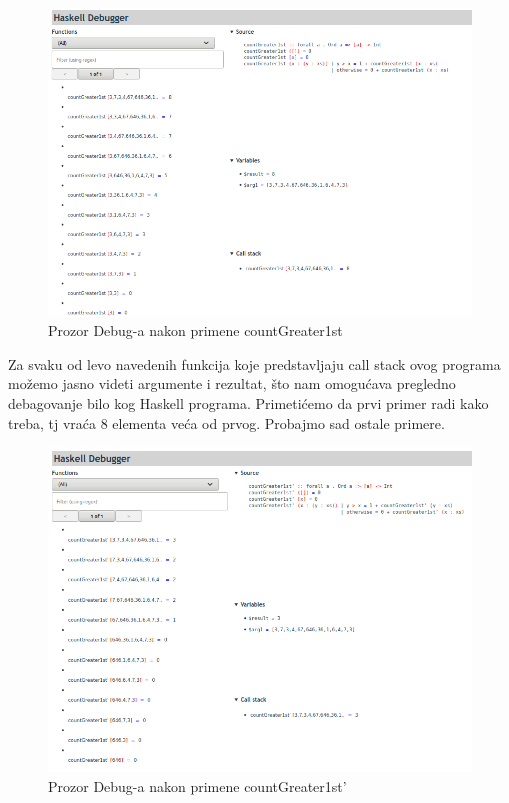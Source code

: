 \documentclass[a4paper]{article}
\begin{document}
{{\begin{figure}[h!]
\begin{center}
\includegraphics[scale=0.4]{mitchell-browser-pregled.png}
\caption{Prozor Debug-a nakon primene countGreater1st}
\end{center}
\end{figure}

Za svaku od levo navedenih funkcija koje predstavljaju call stack ovog programa možemo jasno videti argumente i rezultat, što nam omogućava pregledno debagovanje bilo kog Haskell programa.
Primetićemo da prvi primer radi kako treba, tj vraća 8 elementa veća od prvog. Probajmo sad ostale primere.

\begin{figure}[h!]
\begin{center}
\includegraphics[scale=0.3]{mitchell-browser-pregled'.png}
\caption{Prozor Debug-a nakon primene countGreater1st'}
\end{center}
\end{figure}

}}
\end{document}
